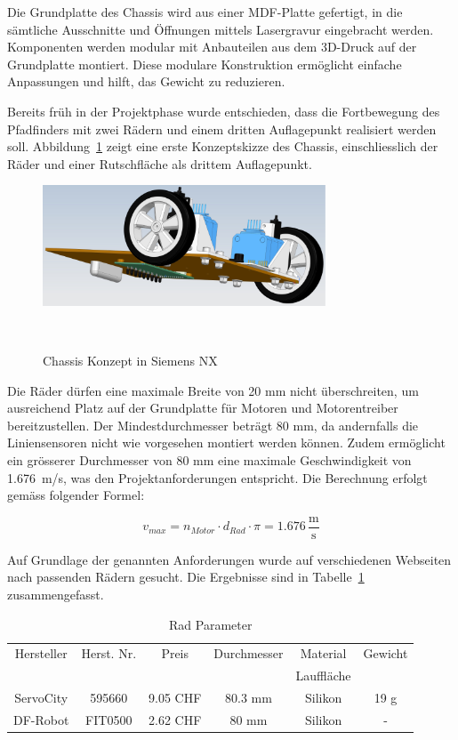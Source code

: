 \documentclass[main.tex]{subfiles} %
\begin{document}
Die Grundplatte des Chassis wird aus einer MDF-Platte gefertigt, in die
sämtliche Ausschnitte und Öffnungen mittels Lasergravur eingebracht werden.
Komponenten werden modular mit Anbauteilen aus dem 3D-Druck auf der Grundplatte
montiert. Diese modulare Konstruktion ermöglicht einfache Anpassungen und
hilft, das Gewicht zu reduzieren.

Bereits früh in der Projektphase wurde entschieden, dass die Fortbewegung des
Pfadfinders mit zwei Rädern und einem dritten Auflagepunkt realisiert werden
soll. Abbildung~\ref{fig:Radkonzept} zeigt eine erste Konzeptskizze des
Chassis, einschliesslich der Räder und einer Rutschfläche als drittem
Auflagepunkt.

\begin{figure}[H]
    \centering
    \includegraphics[width=0.75\textwidth]{Radkonzept.pdf}
    \caption{Chassis Konzept in Siemens NX}~\label{fig:Radkonzept}
\end{figure}

Die Räder dürfen eine maximale Breite von 20 mm nicht überschreiten, um
ausreichend Platz auf der Grundplatte für Motoren und Motorentreiber
bereitzustellen. Der Mindestdurchmesser beträgt 80 mm, da andernfalls die
Liniensensoren nicht wie vorgesehen montiert werden können. Zudem ermöglicht
ein grösserer Durchmesser von 80 mm eine maximale Geschwindigkeit von
1.676~m/s, was den Projektanforderungen entspricht. Die Berechnung erfolgt
gemäss folgender Formel:

\[ v_{max} = n_{Motor} \cdot d_{Rad} \cdot \pi = 1.676 \, \frac{\text{m}}{\text{s}} \]

Auf Grundlage der genannten Anforderungen wurde auf verschiedenen Webseiten
nach passenden Rädern gesucht. Die Ergebnisse sind in
Tabelle~\ref{tab:Rad_Parameter} zusammengefasst.

\begin{table}[h]                                    %
    \centering
    \begin{tabular}{|c|c|c|c|c|c|}                        %
        \hline
        Hersteller & Herst. Nr. & Preis    & Durchmesser & Material   & Gewicht \\
                   &            &          &             & Lauffläche &         \\ \hline
        ServoCity  & 595660     & 9.05 CHF & 80.3 mm     & Silikon    & 19 g    \\ \hline
        DF-Robot   & FIT0500    & 2.62 CHF & 80 mm       & Silikon    & -       \\ \hline
    \end{tabular}
    \caption{Rad Parameter}
    \label{tab:Rad_Parameter}
\end{table}
\end{document}

